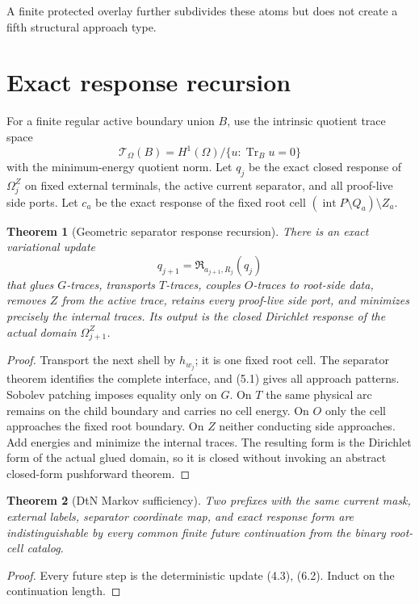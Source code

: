 \documentclass[11pt]{article}
\newtheorem{theorem}{Theorem}[section]
\theoremstyle{definition}
\theoremstyle{remark}
\newcommand{\Tr}{\operatorname{Tr}}
\newcommand{\Int}{\operatorname{int}}
\newcommand{\cT}{\mathcal T}
\newcommand{\cR}{\mathfrak R}
\begin{document}
A finite protected overlay further subdivides these atoms but does not create a
fifth structural approach type.

\section{Exact response recursion}
For a finite regular active boundary union $B$, use the intrinsic quotient
trace space
\[
 \cT_\Omega(B)=H^1(\Omega)/\{u:\Tr_Bu=0\}
 \tag{6.1}
\]
with the minimum-energy quotient norm.  Let $q_j$ be the exact closed response
of $\Omega_j^Z$ on fixed external terminals, the active current separator, and
all proof-live side ports.  Let $c_a$ be the exact response of the fixed root
cell $(\Int P\setminus Q_a)\setminus Z_a$.

\begin{theorem}[Geometric separator response recursion]
There is an exact variational update
\[
 q_{j+1}=\cR_{a_{j+1},R_j}(q_j)
 \tag{6.2}
\]
that glues $G$-traces, transports $T$-traces, couples $O$-traces to root-side
data, removes $Z$ from the active trace, retains every proof-live side port,
and minimizes precisely the internal traces.  Its output is the closed
Dirichlet response of the actual domain $\Omega_{j+1}^Z$.
\end{theorem}

\begin{proof}
Transport the next shell by $h_{w_j}$; it is one fixed root cell.  The
separator theorem identifies the complete interface, and (5.1) gives all
approach patterns.  Sobolev patching imposes equality only on $G$.  On $T$ the
same physical arc remains on the child boundary and carries no cell energy.
On $O$ only the cell approaches the fixed root boundary.  On $Z$ neither
conducting side approaches.  Add energies and minimize the internal traces.
The resulting form is the Dirichlet form of the actual glued domain, so it is
closed without invoking an abstract closed-form pushforward theorem.
\end{proof}

\begin{theorem}[DtN Markov sufficiency]
Two prefixes with the same current mask, external labels, separator coordinate
map, and exact response form are indistinguishable by every common finite
future continuation from the binary root-cell catalog.
\end{theorem}

\begin{proof}
Every future step is the deterministic update (4.3), (6.2).  Induct on the
continuation length.
\end{proof}
\end{document}
